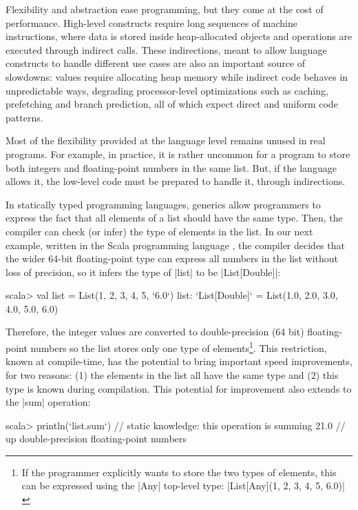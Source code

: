 Flexibility and abstraction ease programming, but they come at the cost of performance. High-level constructs require long sequences of machine instructions, where data is stored inside heap-allocated objects and operations are executed through indirect calls. These indirections, meant to allow language constructs to handle different use cases are also an important source of slowdowns: values require allocating heap memory while indirect code behaves in unpredictable ways, degrading processor-level optimizations such as caching, prefetching and branch prediction, all of which expect direct and uniform code patterns. %

Most of the flexibility provided at the language level remains unused in real programs. For example, in practice, it is rather uncommon for a program to store both integers and floating-point numbers in the same list. But, if the language allows it, the low-level code must be prepared to handle it, through indirections.

In statically typed programming languages, generics allow programmers to express the fact that all elements of a list should have the same type. Then, the compiler can check (or infer) the type of elements in the list. In our next example, written in the Scala programming language \cite{scala-odersky}, the compiler decides that the wider 64-bit floating-point type can express all numbers in the list without loss of precision, so it infers the type of |list| to be |List[Double]|:

\begin{lstlisting-nobreak}
 scala> val list = List(1, 2, 3, 4, 5, `6.0`)
 list: `List[Double]` = List(1.0, 2.0, 3.0, 4.0, 5.0, 6.0)
\end{lstlisting-nobreak}

Therefore, the integer values are converted to double-precision (64 bit) floating-point numbers so the list stores only one type of elements\footnote{If the programmer explicitly wants to store the two types of elements, this can be expressed using the |Any| top-level type: |List[Any](1, 2, 3, 4, 5, 6.0)|}. This restriction, known at compile-time, has the potential to bring important speed improvements, for two reasons: (1) the elements in the list all have the same type and (2) this type is known during compilation. This potential for improvement also extends to the |sum| operation:

\begin{lstlisting-nobreak}
 scala> println(`list.sum`) // static knowledge: this operation is summing
 21.0                             // up double-precision floating-point numbers
\end{lstlisting-nobreak}

